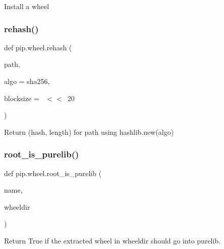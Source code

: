 \begin{DoxyVerb}Install a wheel\end{DoxyVerb}
 \mbox{\label{namespacepip_1_1wheel_a9a0d61b894cb798929ca0187950e30fe}} 
\subsubsection{\texorpdfstring{rehash()}{rehash()}}
{\footnotesize\ttfamily def pip.\+wheel.\+rehash (\begin{DoxyParamCaption}\item[{}]{path,  }\item[{}]{algo = {\ttfamily \textquotesingle{}sha256\textquotesingle{}},  }\item[{}]{blocksize = {~$<$$<$~20} }\end{DoxyParamCaption})}

\begin{DoxyVerb}Return (hash, length) for path using hashlib.new(algo)\end{DoxyVerb}
 \mbox{\label{namespacepip_1_1wheel_acc591f6768fbe320deb0417b1163f43f}} 
\subsubsection{\texorpdfstring{root\+\_\+is\+\_\+purelib()}{root\_is\_purelib()}}
{\footnotesize\ttfamily def pip.\+wheel.\+root\+\_\+is\+\_\+purelib (\begin{DoxyParamCaption}\item[{}]{name,  }\item[{}]{wheeldir }\end{DoxyParamCaption})}

\begin{DoxyVerb}Return True if the extracted wheel in wheeldir should go into purelib.
\end{DoxyVerb}
 \mbox{\label{namespacepip_1_1wheel_a43b1d222c327f5a2fd315a497ab74c44}} 
